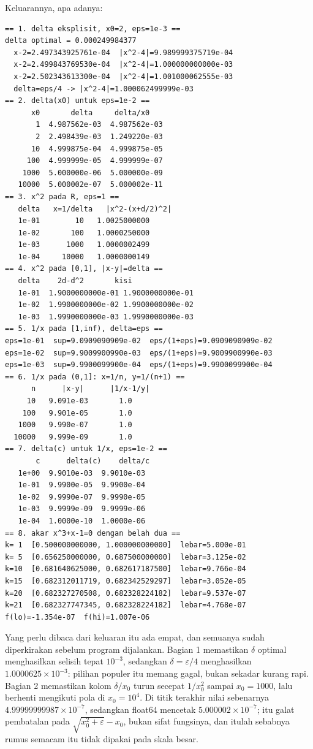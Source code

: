 \newpage
Keluarannya, apa adanya:

\begin{verbatim}
== 1. delta eksplisit, x0=2, eps=1e-3 ==
delta optimal = 0.000249984377
  x-2=2.497343925761e-04  |x^2-4|=9.989999375719e-04
  x-2=2.499843769530e-04  |x^2-4|=1.000000000000e-03
  x-2=2.502343613300e-04  |x^2-4|=1.001000062555e-03
  delta=eps/4 -> |x^2-4|=1.000062499999e-03
== 2. delta(x0) untuk eps=1e-2 ==
      x0       delta     delta/x0
       1  4.987562e-03  4.987562e-03
       2  2.498439e-03  1.249220e-03
      10  4.999875e-04  4.999875e-05
     100  4.999999e-05  4.999999e-07
    1000  5.000000e-06  5.000000e-09
   10000  5.000002e-07  5.000002e-11
== 3. x^2 pada R, eps=1 ==
   delta   x=1/delta   |x^2-(x+d/2)^2|
   1e-01        10   1.0025000000
   1e-02       100   1.0000250000
   1e-03      1000   1.0000002499
   1e-04     10000   1.0000000149
== 4. x^2 pada [0,1], |x-y|=delta ==
   delta    2d-d^2       kisi
   1e-01  1.9000000000e-01 1.9000000000e-01
   1e-02  1.9900000000e-02 1.9900000000e-02
   1e-03  1.9990000000e-03 1.9990000000e-03
== 5. 1/x pada [1,inf), delta=eps ==
eps=1e-01  sup=9.0909090909e-02  eps/(1+eps)=9.0909090909e-02
eps=1e-02  sup=9.9009900990e-03  eps/(1+eps)=9.9009900990e-03
eps=1e-03  sup=9.9900099900e-04  eps/(1+eps)=9.9900099900e-04
== 6. 1/x pada (0,1]: x=1/n, y=1/(n+1) ==
      n      |x-y|      |1/x-1/y|
     10   9.091e-03       1.0
    100   9.901e-05       1.0
   1000   9.990e-07       1.0
  10000   9.999e-09       1.0
== 7. delta(c) untuk 1/x, eps=1e-2 ==
       c      delta(c)    delta/c
   1e+00  9.9010e-03  9.9010e-03
   1e-01  9.9900e-05  9.9900e-04
   1e-02  9.9990e-07  9.9990e-05
   1e-03  9.9999e-09  9.9999e-06
   1e-04  1.0000e-10  1.0000e-06
== 8. akar x^3+x-1=0 dengan belah dua ==
k= 1  [0.500000000000, 1.000000000000]  lebar=5.000e-01
k= 5  [0.656250000000, 0.687500000000]  lebar=3.125e-02
k=10  [0.681640625000, 0.682617187500]  lebar=9.766e-04
k=15  [0.682312011719, 0.682342529297]  lebar=3.052e-05
k=20  [0.682327270508, 0.682328224182]  lebar=9.537e-07
k=21  [0.682327747345, 0.682328224182]  lebar=4.768e-07
f(lo)=-1.354e-07  f(hi)=1.007e-06
\end{verbatim}

Yang perlu dibaca dari keluaran itu ada empat, dan semuanya sudah diperkirakan sebelum
program dijalankan. Bagian 1 memastikan $\delta$ optimal menghasilkan selisih tepat
$10^{-3}$, sedangkan $\delta=\varepsilon/4$ menghasilkan $1.0000625\times10^{-3}$:
pilihan populer itu memang gagal, bukan sekadar kurang rapi. Bagian 2 memastikan
kolom $\delta/x_{0}$ turun secepat $1/x_{0}^{2}$ sampai $x_{0}=1000$, lalu berhenti
mengikuti pola di $x_{0}=10^{4}$. Di titik terakhir nilai sebenarnya
$4.99999999987\times10^{-7}$, sedangkan float64 mencetak $5.000002\times10^{-7}$; itu
galat pembatalan pada $\sqrt{x_{0}^{2}+\varepsilon}-x_{0}$, bukan sifat fungsinya, dan
itulah sebabnya rumus semacam itu tidak dipakai pada skala besar.

